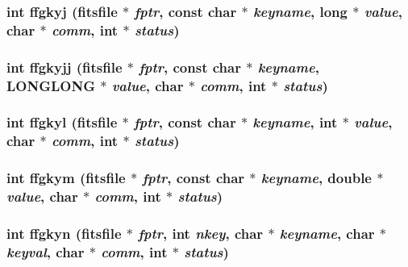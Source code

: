 \subsubsection{\setlength{\rightskip}{0pt plus 5cm}int ffgkyj (\bf{fitsfile} $\ast$ {\em fptr}, const char $\ast$ {\em keyname}, long $\ast$ {\em value}, char $\ast$ {\em comm}, int $\ast$ {\em status})}\label{test_2roimasker_2fitsio_8h_390adabb4fae20ebb831ef865b10cab7}


\subsubsection{\setlength{\rightskip}{0pt plus 5cm}int ffgkyjj (\bf{fitsfile} $\ast$ {\em fptr}, const char $\ast$ {\em keyname}, \bf{LONGLONG} $\ast$ {\em value}, char $\ast$ {\em comm}, int $\ast$ {\em status})}\label{test_2roimasker_2fitsio_8h_6ad49eda5b9e0d9b57def9abc3f60fe5}


\subsubsection{\setlength{\rightskip}{0pt plus 5cm}int ffgkyl (\bf{fitsfile} $\ast$ {\em fptr}, const char $\ast$ {\em keyname}, int $\ast$ {\em value}, char $\ast$ {\em comm}, int $\ast$ {\em status})}\label{test_2roimasker_2fitsio_8h_514f9731bc6c8ba190dccd5d4744f841}


\subsubsection{\setlength{\rightskip}{0pt plus 5cm}int ffgkym (\bf{fitsfile} $\ast$ {\em fptr}, const char $\ast$ {\em keyname}, double $\ast$ {\em value}, char $\ast$ {\em comm}, int $\ast$ {\em status})}\label{test_2roimasker_2fitsio_8h_8e2c807fdca3339d4789efea6f71f64a}


\subsubsection{\setlength{\rightskip}{0pt plus 5cm}int ffgkyn (\bf{fitsfile} $\ast$ {\em fptr}, int {\em nkey}, char $\ast$ {\em keyname}, char $\ast$ {\em keyval}, char $\ast$ {\em comm}, int $\ast$ {\em status})}\label{test_2roimasker_2fitsio_8h_767eade3619fc0d0f2642f25121b2f70}


